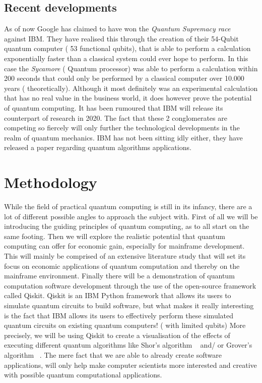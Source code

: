 \subsection{Recent developments}

As of now Google has claimed to have won the \emph{Quantum Supremacy race} ~\autocite{Google2019} against IBM. They have realised this through the creation of their 54-Qubit quantum computer ( 53 functional qubits), that is able to perform a calculation exponentially faster than a classical system could ever hope to perform. In this case the \emph{Sycamore} ( Quantum processor) was able to perform a calculation within 200 seconds that could only be performed by a classical computer over 10.000 years ( theoretically). Although it most definitely was an experimental calculation that has no real value in the business world, it does however prove the potential of quantum computing. It has been rumoured that IBM will release its counterpart of research in 2020. The fact that these 2 conglomerates are competing so fiercely will only further the technological developments in the realm of quantum mechanics. IBM has not been sitting idly either, they have released a paper regarding quantum algorithms applications. \autocite{IBM2019}



\section{Methodology}
\label{sec:Methodology}

While the field of practical quantum computing is still in its infancy, there are a lot of different possible angles to approach the subject with. First of all we will be introducing the guiding principles of quantum computing, as to all start on the same footing. Then we will explore the realistic potential that quantum computing can offer for economic gain, especially for mainframe development. This will mainly be comprised of an extensive literature study that will  set its focus on economic applications of quantum computation and thereby on the mainframe environment.
Finally there will be a demonstration of quantum computation software development through the use of the open-source framework called Qiskit. \autocite{Qiskit} Qiskit is an IBM Python framework that allows its users to simulate quantum circuits to build software, but what makes it really interesting is the fact that IBM allows its users to effectively perform these simulated quantum circuits on existing quantum computers! ( with limited qubits) More precisely, we will be using Qiskit to create a visualisation of the effects of executing different quantum algorithms like Shor's algorithm  ~\autocite{Shor2000} and/ or Grover's algorithm  ~\autocite{Grover1996}. The mere fact that we are able to already create software applications, will only help make computer scientists more interested and creative with possible quantum computational applications.


